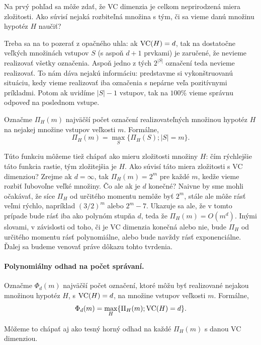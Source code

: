 Na prvý pohľad sa môže zdať, že VC dimenzia je celkom neprirodzená miera
zložitosti. Ako súvisí nejaká rozbiteľná množina s tým, či sa vieme danú
množinu hypotéz $H$ naučiť?

Treba sa na to pozerať z opačného uhla: ak $\mathrm{VC}(H) = d$, tak na 
dostatočne veľkých množinách vstupov $S$ (s aspoň $d + 1$ prvkami) je 
zaručené, že nevieme realizovať všetky označenia. Aspoň jedno z tých
$2^{|S|}$ označení teda nevieme realizovať. To nám dáva nejakú informáciu:
predstavme si vykonštruovanú situáciu, kedy vieme realizovať iba označenia
s nepárne veľa pozitívnymi príkladmi. Potom ak uvidíme $|S| - 1$ vstupov,
tak na $100\%$ vieme správnu odpoveď na poslednom vstupe.

Označme $\Pi_H(m)$ najväčší počet označení realizovateľných množinou
hypotéz $H$ na nejakej množine vstupov veľkosti $m$. Formálne,
$$ \Pi_H(m) = \max_S \{ \Pi_H(S); |S| = m \}. $$

Túto funkciu môžeme tiež chápať ako mieru zložitosti množiny $H$: čím
rýchlejšie táto funkcia rastie, tým zložitejšia je $H$. Ako súvisí táto
miera zložitosti s VC dimenziou? Zrejme ak $d = \infty$, tak $\Pi_H(m) = 2^m$
pre každé $m$, kedže vieme rozbiť ľubovoľne veľké množiny. Čo ale ak je $d$ 
konečné? Naivne by sme mohli očakávať, že síce $\Pi_H$ od určitého 
momentu nemôže byť $2^m$, stále ale môže rásť veľmi rýchlo, napríklad 
$(3/2)^m$ alebo $2^m - 7$. Ukazuje sa ale, že v tomto prípade bude rásť 
iba ako polynóm stupňa $d$, teda že $\Pi_H(m) = O(m^d)$. Inými slovami,
v závislosti od toho, či je VC dimenzia konečná alebo nie, bude $\Pi_H$
od určitého momentu rásť polynomiálne, alebo bude navždy rásť exponenciálne.
Ďalej sa budeme venovať práve dôkazu tohto tvrdenia.


\paragraph{Polynomiálny odhad na počet správaní.}

Označme $\Phi_d(m)$ najväčší počet označení, ktoré môžu byť realizované
nejakou množinou hypotéz $H$, s $\mathrm{VC}(H) = d$, na množine vstupov veľkosti $m$.
Formálne,
$$ \Phi_d(m) = \max_H \{ \Pi_H(m); \mathrm{VC}(H) = d \}. $$

Môžeme to chápať aj ako tesný horný odhad na každé $\Pi_H(m)$ s danou
VC dimenziou.

